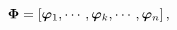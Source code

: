 \begin{equation*}
\label{eq:Phi Structure}
\boldsymbol{\Phi} = \left[ \boldsymbol{\varphi}_1, \cdots, \boldsymbol{\varphi}_{k}, \cdots, \boldsymbol{\varphi}_{n} \right],
\end{equation*}